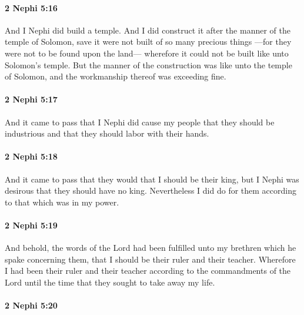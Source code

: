 		\paragraph{2 Nephi 5:16} %
			\label{2NEPHI-5-16}

			And I Nephi did build a temple.
			And I did construct it after the manner of the temple of Solomon,
			save it were not built of so many precious things
			---for they were not to be found upon the land---
			wherefore it could not be built like unto Solomon's temple.
			But the manner of the construction was like unto the temple of Solomon,
			and the workmanship thereof was exceeding fine.

		\paragraph{2 Nephi 5:17} %
			\label{2NEPHI-5-17}

			And it came to pass that I Nephi did cause my people
			that they should be industrious
			and that they should labor with their hands.

		\paragraph{2 Nephi 5:18} %
			\label{2NEPHI-5-18}

			And it came to pass that they would that I should be their king,
			but I Nephi was desirous that they should have no king.
			Nevertheless I did do for them according to that which was in my power.

		\paragraph{2 Nephi 5:19} %
			\label{2NEPHI-5-19}

			And behold, the words of the Lord had been fulfilled unto my brethren
			which he spake concerning them, that I should be their ruler and their teacher.
			Wherefore I had been their ruler and their teacher
			according to the commandments of the Lord
			until the time that they sought to take away my life.

		\paragraph{2 Nephi 5:20} %
			\label{2NEPHI-5-20}

